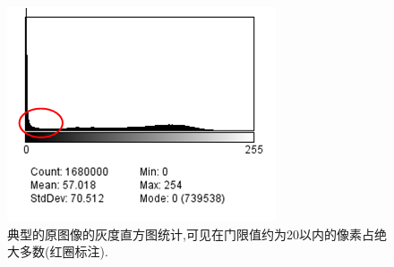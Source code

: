 \begin{figure}[t]
	\begin{center}
		\includegraphics[width=0.75\linewidth]{src/hist}
	\end{center}
	\caption{典型的原图像的灰度直方图统计,可见在门限值约为20以内的像素占绝大多数(红圈标注).}
	\label{fig:hist}	
\end{figure}
